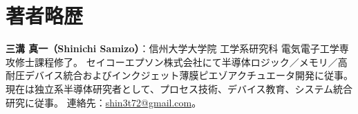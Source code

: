 \documentclass[journal,onecolumn]{IEEEtran}
\begin{document}
\section*{著者略歴}
\noindent\textbf{三溝 真一（Shinichi Samizo）}：信州大学大学院 工学系研究科 電気電子工学専攻修士課程修了。
セイコーエプソン株式会社にて半導体ロジック／メモリ／高耐圧デバイス統合およびインクジェット薄膜ピエゾアクチュエータ開発に従事。
現在は独立系半導体研究者として、プロセス技術、デバイス教育、システム統合研究に従事。
連絡先：\href{mailto:shin3t72@gmail.com}{shin3t72@gmail.com}。
\end{document}
